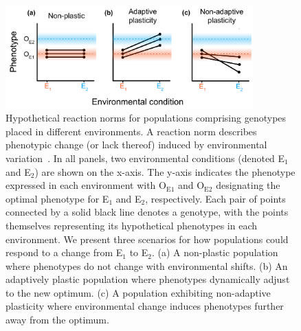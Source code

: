 \begin{raggedbottom}
\begin{figure}[ht!]
\centering
\includegraphics[width=0.85\textwidth]{02_consequences_of_plasticity/media/media-reaction-norms.pdf}
\caption{\small
Hypothetical reaction norms for populations comprising genotypes placed in different environments.
A reaction norm describes phenotypic change (or lack thereof) induced by environmental variation~\citep{west-eberhard_phenotypic_2008}. 
In all panels, two environmental conditions (denoted E$_1$ and E$_2$) are shown on the x-axis.
The y-axis indicates the phenotype expressed in each environment with O$_{\text{E}1}$ and O$_{\text{E}2}$ designating the optimal phenotype for E$_1$ and E$_2$, respectively.
Each pair of points connected by a solid black line denotes a genotype, with the points themselves representing its hypothetical phenotypes in each environment.
We present three scenarios for how populations could respond to a change from E$_1$ to E$_2$.
(a) A non-plastic population where phenotypes do not change with environmental shifts.  
(b) An adaptively plastic population where phenotypes dynamically adjust to the new optimum. 
(c) A population exhibiting non-adaptive plasticity where environmental change induces phenotypes further away from the optimum. 
}
\label{fig:reaction-norms}
\end{figure}


\end{raggedbottom}
